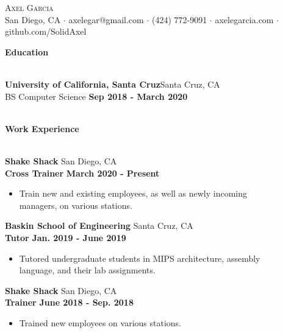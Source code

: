 \documentclass[a4paper]{article}
\newcommand{\lineunder} {
    \vspace*{-8pt} \\
    \hspace*{-18pt} \hrulefill \\
}
\newcommand{\header} [1] {
    {\hspace*{-18pt}\vspace*{6pt}\LARGE \textbf{#1}}
    \vspace*{-6pt} \lineunder
}
\begin{document}
\vspace*{-40pt}

    

\vspace*{-10pt}
\begin{center}
	{\Huge \scshape {Axel Garcia}}\\[2mm]
	San Diego, CA $\cdot$ axelegar@gmail.com $\cdot$ (424) 772-9091 $\cdot$ axelegarcia.com $\cdot$ github.com/SolidAxel\\
\end{center}

\header{Education}
\vspace{1mm}

\textbf{University of California, Santa Cruz}\hfill Santa Cruz, CA\\
\quad BS Computer Science \hfill \textbf{Sep 2018 - March 2020}\\ \quad\quad {}\\
\vspace{3mm}

\header{Work Experience}
\vspace{1mm}

\textbf{Shake Shack} \hfill San Diego, CA\\
\hspace{4mm} \textbf{Cross Trainer} \hfill \textbf{March 2020 - Present}\\
\vspace{-2mm}
\begin{itemize} \itemsep 1pt
	\item Train new and existing employees, as well as newly incoming\\ managers, on various stations.
\end{itemize}

\textbf{Baskin School of Engineering} \hfill Santa Cruz, CA\\
\hspace{4mm} \textbf{Tutor} \hfill \textbf{Jan. 2019 - June 2019}\\
\vspace{-2mm}
\begin{itemize} \itemsep 1pt
	\item Tutored undergraduate students in MIPS architecture, assembly\\language, and their lab assignments.
\end{itemize}

\textbf{Shake Shack} \hfill San Diego, CA\\
\hspace{4mm} \textbf{Trainer} \hfill \textbf{June 2018 - Sep. 2018}\\
\vspace{-2mm}
\begin{itemize} \itemsep 1pt
	\item Trained new employees on various stations.
\end{itemize}
\end{document}
